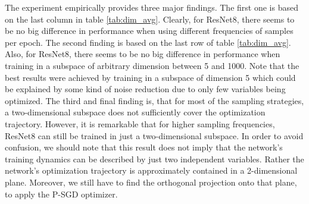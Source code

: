 \documentclass[11pt, a4paper]{article}
\begin{document}
The experiment empirically provides three major findings. The first one is based on the last column in table \ref{tab:dim_avg}. Clearly, for ResNet8, there seems to be no big difference in performance when using different frequencies of samples per epoch. The second finding is based on the last row of table \ref{tab:dim_avg}. Also, for ResNet8, there seems to be no big difference in performance when training in a subspace of arbitrary dimension between 5 and 1000. Note that the best results were achieved by training in a subspace of dimension 5 which could be explained by some kind of noise reduction due to only few variables being optimized. The third and final finding is, that for most of the sampling strategies, a two-dimensional subspace does not sufficiently cover the optimization trajectory. However, it is remarkable that for higher sampling frequencies, ResNet8 can still be trained in just a two-dimensional subspace. In order to avoid confusion, we should note that this result does not imply that the network's training dynamics can be described by just two independent variables. Rather the network's optimization trajectory is approximately contained in a 2-dimensional plane. Moreover, we still have to find the orthogonal projection onto that plane, to apply the P-SGD optimizer.


\end{document}
